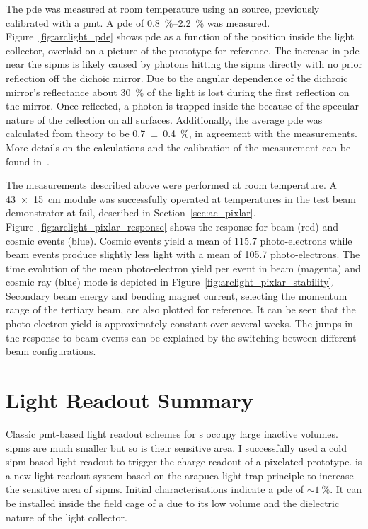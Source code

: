 The \gls{pde} was measured at room temperature using an  source, previously calibrated with a \gls{pmt}.
A \gls{pde} of \SIrange{0.8}{2.2}{\percent} was measured.
Figure~\ref{fig:arclight_pde} shows \gls{pde} as a function of the position inside the light collector, overlaid on a picture of the prototype for reference.
The increase in \gls{pde} near the \glspl{sipm} is likely caused by photons hitting the \glspl{sipm} directly with no prior reflection off the dichoic mirror.
Due to the angular dependence of the dichroic mirror's reflectance about \SI{30}{\percent} of the light is lost during the first reflection on the mirror.
Once reflected, a photon is trapped inside the \AL{} because of the specular nature of the reflection on all surfaces.
Additionally, the average \gls{pde} was calculated from theory to be \SI{0.7 +- 0.4}{\percent}, in agreement with the measurements.
More details on the calculations and the calibration of the measurement can be found in~\cite{arclight}.

The measurements described above were performed at room temperature.
A \SI{43 x 15}{\centi\metre} \AL{} module was successfully operated at \lar{} temperatures in the \pixlar{} test beam demonstrator at \gls{fail}, described in Section~\ref{sec:ac_pixlar}.
Figure~\ref{fig:arclight_pixlar_response} shows the response for beam (red) and cosmic events (blue).
Cosmic events yield a mean of \num{115.7} photo-electrons while beam events produce slightly less light with a mean of \num{105.7} photo-electrons.
The time evolution of the mean photo-electron yield per event in beam (magenta) and cosmic ray (blue) mode is depicted in Figure~\ref{fig:arclight_pixlar_stability}.
Secondary beam energy and bending magnet current, selecting the momentum range of the tertiary beam, are also plotted for reference.
It can be seen that the photo-electron yield is approximately constant over several weeks.
The jumps in the response to beam events can be explained by the switching between different beam configurations.


\section{Light Readout Summary}
\label{sec:studies_light-col-summary}

Classic \gls{pmt}-based light readout schemes for \lartpc{}s occupy large inactive volumes.
\glspl{sipm} are much smaller but so is their sensitive area.
I successfully used a cold \gls{sipm}-based light readout to trigger the charge readout of a pixelated \lartpc{} prototype.
\AL{} is a new light readout system based on the \gls{arapuca} light trap principle to increase the sensitive area of \glspl{sipm}.
Initial characterisations indicate a \gls{pde} of $\sim{\SI{1}{\percent}}$.
It can be installed inside the field cage of a \lartpc{} due to its low volume and the dielectric nature of the light collector.